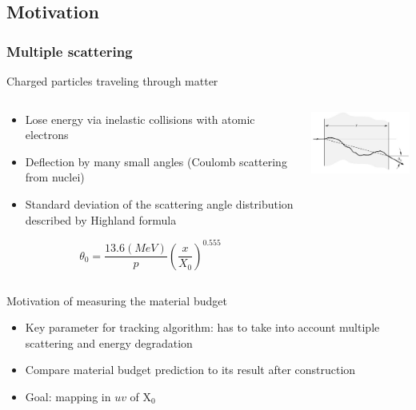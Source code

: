 \documentclass{beamer}
\begin{document}
  \subsection{Motivation}

  \begin{frame}
    \frametitle{Multiple scattering}
    
    \vspace{-0.4cm} 
    \begin{block}{Charged particles traveling through matter}
      \vspace{-0.3cm}
      \begin{columns}[c]
        \begin{column}{5cm}
          \footnotesize
          \begin{itemize}
            \item Lose energy via inelastic collisions with atomic electrons
            \item Deflection by many small angles (Coulomb scattering from nuclei)
            \item Standard deviation of the scattering angle distribution described by Highland formula
          \end{itemize}
          \vspace{-0.1cm}
          \centering
            \[ \theta_0 = \frac{13.6 (MeV)}{p}\left( \frac{x}{X_0}\right)^{0.555}\]
        \end{column}
        \begin{column}{6cm}
          \centering
          \includegraphics[width = 5cm]{Pictures/multiple_scattering.jpg}
        \end{column}
      \end{columns}
    \end{block}

    \vspace{-0.3cm}
    \begin{block}{Motivation of measuring the material budget}
      \footnotesize
      \begin{itemize}
        \item Key parameter for tracking algorithm: has to take into account multiple scattering and energy degradation
        \item Compare material budget prediction to its result after construction
        \item Goal: mapping in $uv$ of X$_0$
      \end{itemize}
    \end{block}
  \end{frame} 
  
\end{document}
